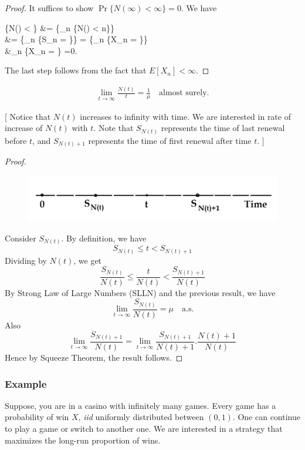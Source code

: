\documentclass[a4paper,10pt, english]{article}
\begin{document}
\begin{proof}
	It suffices to show $\Pr\{N(\infty) < \infty\} = 0$. We have
	\begin{flalign*}
	\Pr\{N(\infty) < \infty\} &= \Pr\{\bigcup_{n \in \N} \{N(\infty) < n\}\}\\
	&= \Pr\{\bigcup_{n \in \N} \{S_n = \infty\}\} = \Pr\{\bigcup_{n \in \N} \{X_n = \infty\}\} \\
	&\leq \sum_{n \in \N}\Pr\{X_n = \infty\} =0.
	\end{flalign*}
	The last step follows from the fact that $E[X_n] < \infty$.
\end{proof}
\begin{thm}
	
	
	\begin{align*}
	\lim_{t \to \infty} \frac{N(t)}{t} = \frac{1}{\mu} \quad \mbox{almost surely}.
	\end{align*}
\end{thm}
[
Notice that $N(t)$ increases to infinity with time. We are interested in rate of increase of $N(t)$ with $t$. Note that $S_{N(t)}$ represents the time of last renewal before $t$, and $S_{N(t)+1}$ represents the time of first renewal after time $t$. ] \\

\begin{proof}
	\begin{figure}
		\includegraphics[width=\linewidth]{Figures/lecture_5_fig_1.png}
	\end{figure}
	Consider $S_{N(t)}$. By definition, we have
	\[S_{N(t)} \leq t < S_{N(t)+1}\]
	Dividing by $N(t)$, we get 
	\[\frac{S_{N(t)}}{N(t)} \leq \frac{t}{N(t)} < \frac{S_{N(t)+1}}{N(t)}\]
	By Strong Law of Large Numbers (SLLN) and the previous result, we have
	\[\lim_{t \to \infty}\frac{S_{N(t)}}{N(t)} = \mu \quad \mbox{a.s.}\] 
	Also
	\[\lim_{t \to \infty} \frac{S_{N(t)+1}}{N(t)} = \lim_{t \to \infty} \frac{S_{N(t)+1}}{N(t)+1}.\frac{N(t)+1}{N(t)} \]
	Hence by Squeeze Theorem, the result follows.
\end{proof}


\subsubsection{Example}
Suppose, you are in a casino with infinitely many games. Every game has a probability of win $X$, \emph{iid} uniformly distributed between $(0,1)$. One can continue to play a game or switch to another one. We are interested in a strategy that maximizes the long-run proportion of wins.
\end{document}
